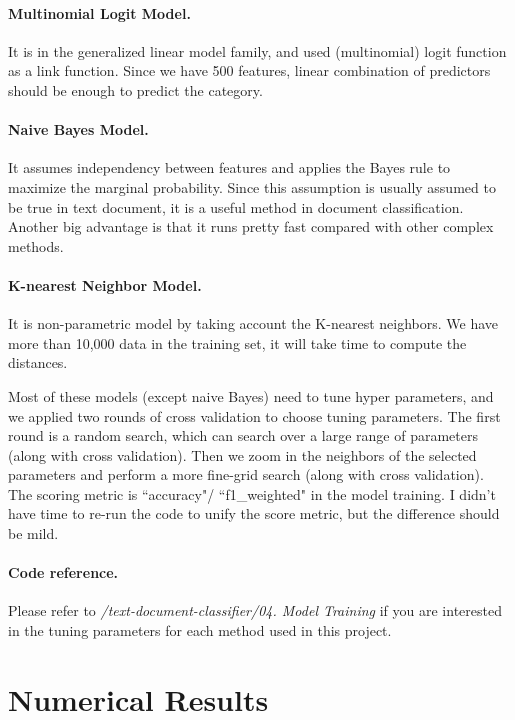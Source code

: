\documentclass[11pt]{article}
\theoremstyle{remark}
\begin{document}
\paragraph{Multinomial Logit Model.} 
It is in the generalized linear model family, and used (multinomial) logit function as a link function. Since we have 500 features, linear combination of predictors should be enough to predict the category.
\paragraph{Naive Bayes Model.}
It assumes independency between features and applies the Bayes rule to maximize the marginal probability. Since this assumption is usually assumed to be true in text document, it is a useful method in document classification. Another big advantage is that it runs pretty fast compared with other complex methods. 
\paragraph{K-nearest Neighbor Model.}
It is non-parametric model by taking account the K-nearest neighbors. We have more than 10,000 data in the training set, it will take time to compute the distances. 

Most of these models (except naive Bayes) need to tune hyper parameters, and we applied two rounds of cross validation to choose tuning parameters. The first round is a random search, which can search over a large range of parameters (along with cross validation). Then we zoom in the neighbors of the selected parameters and perform a more fine-grid search (along with cross validation). The scoring metric is ``accuracy"/ ``f1\_weighted"  in the model training. I didn't have time to re-run the code to unify the score metric, but the difference should be mild.

\paragraph{Code reference.}
Please refer to {\em /text-document-classifier/04. Model Training} if you are interested in the tuning parameters for each method used in this project.

\section{Numerical Results}
\end{document}
